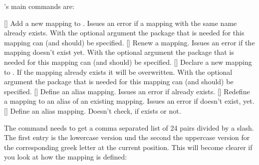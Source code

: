 \documentclass[load-preamble+]{cnltx-doc}
\begin{document}
\chemgreek's main commands are:
\begin{commands}
  []
    Add a new mapping to \chemgreek.  Issues an error if a
    mapping with the same name already exists.  With the optional argument the
    package that is needed for this mapping can (and should) be specified.
  []
    Renew a \chemgreek{} mapping.  Issues an error if the
    mapping doesn't exist yet.  With the optional argument the package that is
    needed for this mapping can (and should) be specified.
  []
    Declare a new mapping to \chemgreek.  If the mapping
    already exists it will be overwritten.  With the optional argument the
    package that is needed for this mapping can (and should) be specified.
  []
    Define an alias mapping.  Issues an error if  already exists.
  []
    Redefine a mapping to an alias of an existing mapping.
    Issues an error if  doesn't exist, yet.
  []
    Define an alias mapping.  Doesn't check, if  exists or not.
\end{commands}

The command  needs to get a comma separated list of
24 pairs divided by a slash.  The first entry is the lowercase version und the
second the uppercase version for the corresponding greek letter at the current
position.  This will become clearer if you look at how the 
mapping is defined:
\end{document}
